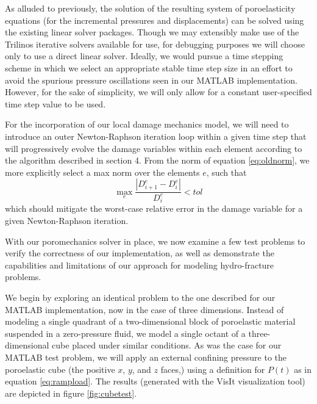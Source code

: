 \documentclass[11pt]{article} %
\begin{document}
As alluded to previously, the solution of the resulting system of poroelasticity equations (for the incremental pressures and displacements) can be solved using the existing linear solver packages. Though we may extensibly make use of the Trilinos iterative solvers available for use, for debugging purposes we will choose only to use a direct linear solver. Ideally, we would pursue a time stepping scheme in which we select an appropriate stable time step size in an effort to avoid the spurious pressure oscillations seen in our MATLAB implementation. However, for the sake of simplicity, we will only allow for a constant user-specified time step value to be used.

For the incorporation of our local damage mechanics model, we will need to introduce an outer Newton-Raphson iteration loop within a given time step that will progressively evolve the damage variables within each element according to the algorithm described in section 4. From the norm of equation \ref{eq:oldnorm}, we more explicitly select a max norm over the elements $e$, such that
\begin{equation}
	\max_e \frac{| D^e_{i+1} - D^e_{i} |}{D^e_{i}} < tol
\end{equation}
which should mitigate the worst-case relative error in the damage variable for a given Newton-Raphson iteration.

With our poromechanics solver in place, we now examine a few test problems to verify the correctness of our implementation, as well as demonstrate the capabilities and limitations of our approach for modeling hydro-fracture problems.

We begin by exploring an identical problem to the one described for our MATLAB implementation, now in the case of three dimensions. Instead of modeling a single quadrant of a two-dimensional block of poroelastic material suspended in a zero-pressure fluid, we model a single octant of a three-dimensional cube placed under similar conditions. As was the case for our MATLAB test problem, we will apply an external confining pressure to the poroelastic cube (the positive $x$, $y$, and $z$ faces,) using a definition for $P(t)$ as in equation \ref{eq:rampload}. The results (generated with the VisIt visualization tool) are depicted in figure \ref{fig:cubetest}.
\end{document}
